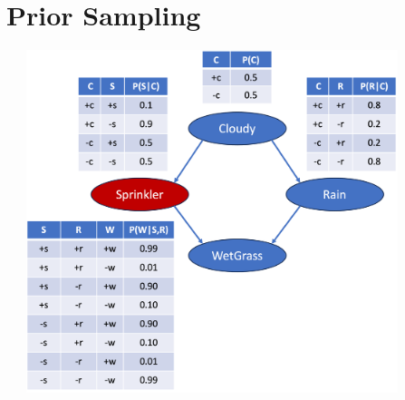 \documentclass[11pt,a4paper]{report}
\begin{document}
\section{Prior Sampling}

\includegraphics[width=12cm, height = 10cm]{sampling_prior.png}
\end{document}
